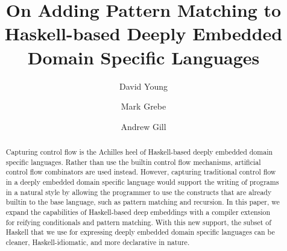 \documentclass[runningheads, a4paper]{llncs}
\begin{document}
\title{On Adding Pattern Matching to Haskell-based
  Deeply Embedded Domain Specific Languages}


\author{David Young \and Mark Grebe \and Andrew Gill}

\maketitle







\begin{abstract}
  Capturing control flow is the Achilles heel of Haskell-based
  deeply embedded domain specific languages.
  Rather than use
  the builtin control flow mechanisms, artificial control flow combinators
  are used instead.
  However, capturing traditional control flow in a deeply embedded domain specific language
  would support the writing of programs in a natural style by allowing the programmer to use the
  constructs that are already builtin to the base language, such as pattern
  matching and recursion.
  In this paper, we expand the capabilities of
  Haskell-based deep embeddings with a compiler extension
  for reifying conditionals and pattern matching.
  With this new support, the subset of Haskell that we use for expressing
  deeply embedded domain specific languages can be cleaner, Haskell-idiomatic,
  and more declarative in nature.

\end{abstract}
\end{document}
